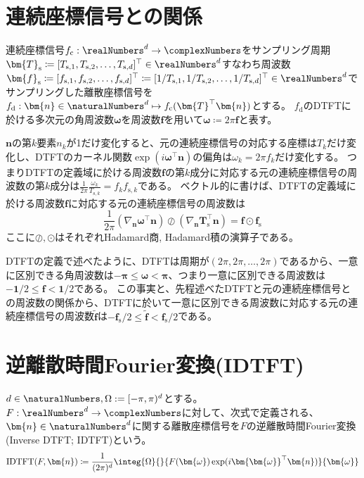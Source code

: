 			\section{連続座標信号との関係}
				連続座標信号$f_\text{c}:\realNumbers^d\to\complexNumbers$をサンプリング周期$\bm{T}_\text{s} \coloneqq [T_{\text{s},1}, T_{\text{s},2}, \dotsc, T_{\text{s},d}]^\top\in\realNumbers^d$すなわち周波数$\bm{f}_\text{s} \coloneqq [f_{\text{s},1}, f_{\text{s},2}, \dotsc, f_{\text{s},d}]^\top \coloneqq [1/T_{\text{s},1}, 1/T_{\text{s},2}, \dotsc, 1/T_{\text{s},d}]^\top\in\realNumbers^d$でサンプリングした離散座標信号を$f_\text{d}: \bm{n}\in\naturalNumbers^d\mapsto f_\text{c}(\bm{T}^\top\bm{n})$とする。
				$f_\text{d}$のDTFTに於ける多次元の角周波数$\bm{\omega}$を周波数$\bm{f}$を用いて$\bm{\omega} \coloneqq 2\pi\bm{f}$と表す。
				\par
				$\bm{n}$の第$k$要素$n_k$が1だけ変化すると、元の連続座標信号の対応する座標は$T_k$だけ変化し、DTFTのカーネル関数$\exp(i\bm{\omega}^\top\bm{n})$の偏角は$\omega_k = 2\pi f_k$だけ変化する。
				つまりDTFTの定義域に於ける周波数$\bm{f}$の第$k$成分に対応する元の連続座標信号の周波数の第$k$成分は$\frac{1}{2\pi}\frac{\omega_k}{T_{\text{s},k}} = f_k f_{\text{s}, k}$である。
				ベクトル的に書けば、DTFTの定義域に於ける周波数$\bm{f}$に対応する元の連続座標信号の周波数は
				\[ \frac{1}{2\pi} \left(\nabla_\bm{n} \bm{\omega}^\top\bm{n}\right) \oslash \left(\nabla_\bm{n} \bm{T}_\text{s}^\top\bm{n}\right) = \bm{f} \odot \bm{f}_\text{s} \]
				ここに$\oslash, \odot$はそれぞれHadamard商, Hadamard積の演算子である。
				\par
				DTFTの定義で述べたように、DTFTは周期が$(2\pi,2\pi,\dotsc,2\pi)$であるから、一意に区別できる角周波数は$-\bm{\pi} \leq \bm{\omega} < \bm{\pi}$、つまり一意に区別できる周波数は$-\bm{1}/2 \leq \bm{f} < \bm{1}/2$である。
				この事実と、先程述べたDTFTと元の連続座標信号との周波数の関係から、DTFTに於いて一意に区別できる周波数に対応する元の連続座標信号の周波数$\tilde{\bm{f}}$は$-\bm{f}_\text{s}/2 \leq \tilde{\bm{f}} < \bm{f}_\text{s}/2$である。
			\section{逆離散時間Fourier変換(IDTFT)}
				$d\in\naturalNumbers, \Omega := [-\pi,\pi)^d$とする。
				$F:\realNumbers^d\to\complexNumbers$に対して、次式で定義される、$\bm{n}\in\naturalNumbers^d$に関する離散座標信号を$F$の逆離散時間Fourier変換(Inverse DTFT; IDTFT)という。
				\[ \text{IDTFT}(F,\bm{n}) \coloneqq \frac{1}{(2\pi)^d}\integ{\Omega}{}{F(\bm{\omega})\exp(i\bm{\bm{\omega}}^\top\bm{n})}{\bm{\omega}} \]
